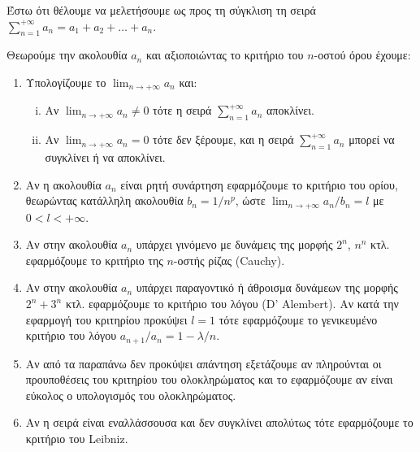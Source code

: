 






\begin{center}
\end{center}

\vspace{2\baselineskip}

Έστω ότι θέλουμε να μελετήσουμε ως προς τη σύγκλιση τη σειρά $ \sum_{n=1}^{+\infty} a_{n} = a_{1} +
a_{2} + \dots + a_{n} $.

Θεωρούμε την ακολουθία  $ a_{n} $ και αξιοποιώντας το κριτήριο του $n$-οστού όρου
έχουμε:

\begin{enumerate}
	\item Υπολογίζουμε το $ \lim_{n\to +\infty} a_{n} $ και:
		\begin{enumerate}[i)]
			\item Αν $ \lim_{n\to +\infty} a_{n} \neq 0 $ τότε η σειρά $ \sum_{n=1}^{+\infty}a_{n}
				$	αποκλίνει.
			\item Αν $ \lim_{n\to +\infty} a_{n} = 0 $ τότε δεν ξέρουμε, και η σειρά
				$ \sum_{n=1}^{+\infty}a_{n} $ μπορεί να συγκλίνει ή να αποκλίνει.
		\end{enumerate}

	\item Αν η ακολουθία $ a_{n} $ είναι ρητή συνάρτηση  εφαρμόζουμε το κριτήριο του ορίου,
		θεωρώντας κατάλληλη ακολουθία $ b_{n} = 1 / n^{p} $, ώστε $ \lim_{n\to +\infty} a_{n}/b_{n} = l
		$ με $ 0<l<+\infty $.

	\item Αν στην ακολουθία $ a_{n} $ υπάρχει γινόμενο με δυνάμεις της μορφής $ 2^{n} $, $ n^{n}
		$ κτλ. εφαρμόζουμε το κριτήριο της $n$-οστής ρίζας (\textlatin{Cauchy}).

	\item Αν στην ακολουθία $ a_{n} $ υπάρχει παραγοντικό ή άθροισμα δυνάμεων της μορφής $ 2^{n} +
		3^{n}$ κτλ. εφαρμόζουμε το κριτήριο του λόγου (\textlatin{D' Alembert}). Αν κατά την
		εφαρμογή του κριτηρίου προκύψει $ l=1 $ τότε εφαρμόζουμε το γενικευμένο κριτήριο του λόγου $
		a_{n+1}/a_{n} = 1 - \lambda/n $.

	\item Αν από τα παραπάνω δεν προκύψει απάντηση εξετάζουμε αν πληρούνται οι προυποθέσεις του
		κριτηρίου του ολοκληρώματος και το εφαρμόζουμε αν είναι εύκολος ο υπολογισμός του
		ολοκληρώματος.

	\item Αν η σειρά είναι εναλλάσσουσα και δεν συγκλίνει απολύτως τότε εφαρμόζουμε το κριτήριο του
		\textlatin{Leibniz}.


\end{enumerate}


